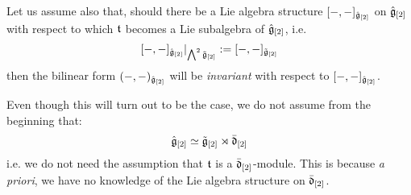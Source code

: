             \begin{convention}
                Let us assume also that, should there be a Lie algebra structure $[-, -]_{\hat{\mathfrak{g}}_{[2]}}$ on $\hat{\mathfrak{g}}_{[2]}$ with respect to which $\mathfrak{t}$ becomes a Lie subalgebra of $\hat{\mathfrak{g}}_{[2]}$, i.e.
                    $$[-, -]_{\hat{\mathfrak{g}}_{[2]}}|_{\bigwedge^2 \tilde{\mathfrak{g}}_{[2]}} := [-, -]_{\tilde{\mathfrak{g}}_{[2]}}$$
                then the bilinear form $(-, -)_{\hat{\mathfrak{g}}_{[2]}}$ will be \textit{invariant} with respect to $[-, -]_{\hat{\mathfrak{g}}_{[2]}}$.

                Even though this will turn out to be the case, we do not assume from the beginning that:
                    $$\hat{\mathfrak{g}}_{[2]} \simeq \tilde{\mathfrak{g}}_{[2]}\rtimes \bar{\mathfrak{d}}_{[2]}$$
                i.e. we do not need the assumption that $\mathfrak{t}$ is a $\bar{\mathfrak{d}}_{[2]}$-module. This is because \textit{a priori}, we have no knowledge of the Lie algebra structure on $\bar{\mathfrak{d}}_{[2]}$.
            \end{convention}

